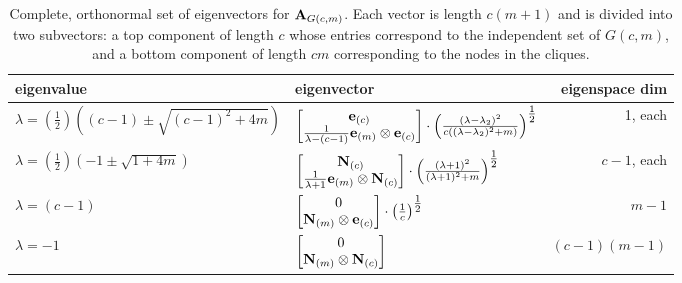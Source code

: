 \begin{table}
    \centering
    \footnotesize
    \begin{tabularx}{\textwidth}{lXr}
      eigenvalue & eigenvector & eigenspace dim\\
      \toprule
      \vspace{5pt}
      $\lambda = \left(\tfrac{1}{2}\right)\left( (c-1) \pm \sqrt{(c-1)^2 + 4m} \right)$ &   $\begin{bmatrix} 
                            \textbf{e}_{(c)} \\
                            \tfrac{1}{\lambda - (c-1)} \textbf{e}_{(m)} \otimes \textbf{e}_{(c)}
                           \end{bmatrix}  \cdot  \left( \frac{(\lambda - \lambda_2)^2}{c ( (\lambda - \lambda_2)^2 + m )} \right)^{\tfrac{1}{2}}$
              & 1, each   \\
      \vspace{5pt}
      $\lambda = \left(\tfrac{1}{2}\right)\left( -1 \pm \sqrt{1 + 4m} \right)$  & $\begin{bmatrix} 
                \textbf{N}_{(c)} \\
                \tfrac{1}{\lambda + 1} \textbf{e}_{(m)}\otimes\textbf{N}_{(c)}
               \end{bmatrix}  \cdot  \left( \frac{(\lambda + 1)^2}{(\lambda + 1)^2 + m} \right)^{\tfrac{1}{2}}$
              & $c-1$, each\\
      \vspace{5pt}
      $\lambda = (c-1)$ & $\begin{bmatrix}  0 \\ \textbf{N}_{(m)} \otimes \textbf{e}_{(c)}  \end{bmatrix}  \cdot  \left( \frac{1}{c} \right)^{\tfrac{1}{2}}$
      &  $m-1$ \\
      \vspace{5pt}
      $\lambda = -1$ & $\begin{bmatrix}  0 \\ \textbf{N}_{(m)} \otimes \textbf{N}_{(c)}  \end{bmatrix} $ & $(c-1)(m-1)$ \\
    \end{tabularx}
    \caption{\label{tab:eigenvectors}
        Complete, orthonormal set of eigenvectors for $\textbf{A}_{G(c,m)}$. Each vector is length $c(m+1)$ and is divided into two subvectors: a top component of length $c$ whose entries correspond to the independent set of $G(c,m)$, and a bottom component of length $cm$ corresponding to the nodes in the cliques.
    }
\end{table}

